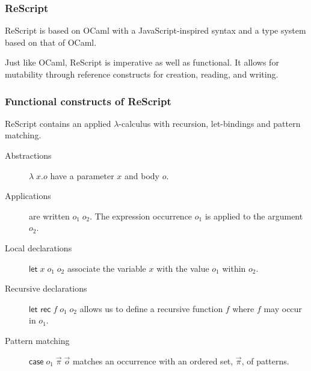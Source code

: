 \documentclass{beamer}
\begin{document}
\begin{frame}
  \frametitle{ReScript}

  ReScript is based on OCaml with a JavaScript-inspired syntax and a
  type system based on that of OCaml. 


  Just like OCaml, ReScript is imperative as well as functional. It
  allows for mutability through reference constructs for creation,
  reading, and writing.
  
\end{frame}




\begin{frame}
  \frametitle{Functional constructs of ReScript}

  ReScript contains an applied $\lambda$-calculus with recursion,
  let-bindings and pattern matching.
  
 \begin{description}
  \item[Abstractions] $\lambda\;x.o$ have a parameter $x$ and
body $o$.  

\item[Applications] are written $o_1\;o_2$. The expression occurrence
  $o_1$ is applied to the argument $o_2$.

\item[Local declarations] $\textsf{let} \; x \; o_1 \; o_2$ associate
the variable $x$ with the value $o_1$ within $o_2$.

\item[Recursive declarations]
$\textsf{let rec} \; f \; o_1 \; o_2$ allows us to define a recursive
function $f$ where $f$ may occur in $o_1$.

\item[Pattern matching] $\textsf{case} \; o_1 \; \vec{\pi} \; \vec{o}$
  matches an occurrence with an ordered set, $\vec{\pi}$, of
  patterns. 
\end{description}

\end{frame}
\end{document}

